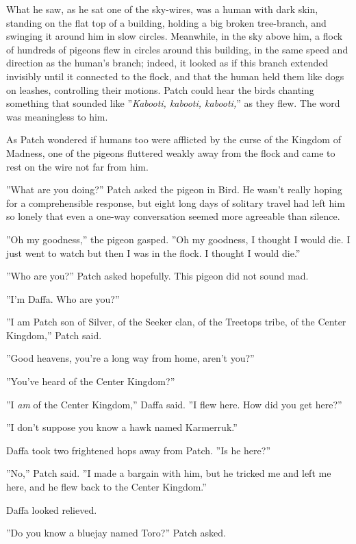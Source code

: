 \documentclass[11pt]{article}
\begin{document}
 What he saw, as he sat one of the sky-wires, was a human with dark skin, standing on the flat top of a building, holding a big broken tree-branch, and swinging it around him in slow circles. Meanwhile, in the sky above him, a flock of hundreds of pigeons flew in circles around this building, in the same speed and direction as the human's branch; indeed, it looked as if this branch extended invisibly until it connected to the flock, and that the human held them like dogs on leashes, controlling their motions. Patch could hear the birds chanting something that sounded like ''{\it Kabooti, kabooti, kabooti,}'' as they flew. The word was meaningless to him.\par
As Patch wondered if humans too were afflicted by the curse of the Kingdom of Madness, one of the pigeons fluttered weakly away from the flock and came to rest on the wire not far from him.\par
 ''What are you doing?'' Patch asked the pigeon in Bird. He wasn't really hoping for a comprehensible response, but eight long days of solitary travel had left him so lonely that even a one-way conversation seemed more agreeable than silence.\par
 ''Oh my goodness,'' the pigeon gasped. ''Oh my goodness, I thought I would die. I just went to watch but then I was in the flock. I thought I would die.''\par
 ''Who are you?'' Patch asked hopefully. This pigeon did not sound mad.\par
 ''I'm Daffa. Who are you?''\par
 ''I am Patch son of Silver, of the Seeker clan, of the Treetops tribe, of the Center Kingdom,'' Patch said.\par
 ''Good heavens, you're a long way from home, aren't you?''\par
 ''You've heard of the Center Kingdom?''\par
 ''I {\it am} of the Center Kingdom,'' Daffa said. ''I flew here. How did you get here?''\par
 ''I don't suppose you know a hawk named Karmerruk.''\par
 Daffa took two frightened hops away from Patch. ''Is he here?''\par
 ''No,'' Patch said. ''I made a bargain with him, but he tricked me and left me here, and he flew back to the Center Kingdom.''\par
 Daffa looked relieved.\par
 ''Do you know a bluejay named Toro?'' Patch asked.\par
\end{document}
